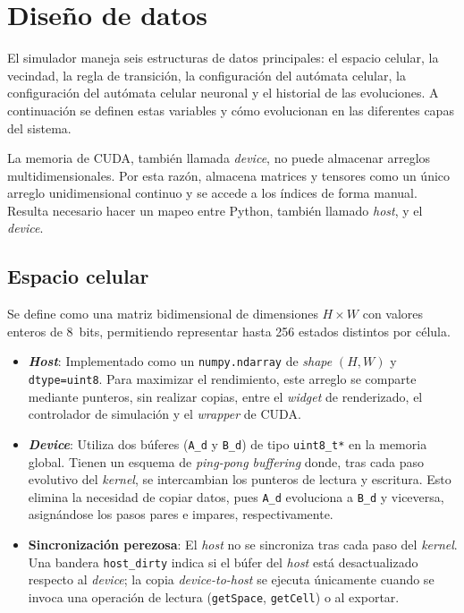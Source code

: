 \section{Diseño de datos}

El simulador maneja seis estructuras de datos principales: el espacio celular, la vecindad, la regla de transición, la configuración del autómata celular, la configuración del autómata celular neuronal y el historial de las evoluciones. A continuación se definen estas variables y cómo evolucionan en las diferentes capas del sistema.

La memoria de CUDA, también llamada \textit{device}, no puede almacenar arreglos multidimensionales. Por esta razón, almacena matrices y tensores como un único arreglo unidimensional continuo y se accede a los índices de forma manual. Resulta necesario hacer un mapeo entre Python, también llamado \textit{host}, y el \textit{device}.

\subsection{Espacio celular}

Se define como una matriz bidimensional de dimensiones $H \times W$ con valores enteros de 8~bits, permitiendo representar hasta 256 estados distintos por célula.

\begin{itemize}
	\item \textbf{\textit{Host}}: Implementado como un \texttt{numpy.ndarray} de \textit{shape} $(H, W)$ y \texttt{dtype=uint8}. Para maximizar el rendimiento, este arreglo se comparte mediante punteros, sin realizar copias, entre el \textit{widget} de renderizado, el controlador de simulación y el \textit{wrapper} de CUDA.
	
	\item \textbf{\textit{Device}}: Utiliza dos búferes (\texttt{A\_d} y \texttt{B\_d}) de tipo \texttt{uint8\_t*} en la memoria global. Tienen un esquema de \textit{ping-pong buffering} donde, tras cada paso evolutivo del \textit{kernel}, se intercambian los punteros de lectura y escritura. Esto elimina la necesidad de copiar datos, pues \texttt{A\_d} evoluciona a \texttt{B\_d} y viceversa, asignándose los pasos pares e impares, respectivamente.
	
	\item \textbf{Sincronización perezosa}: El \textit{host} no se sincroniza tras cada paso del \textit{kernel}. Una bandera \texttt{host\_dirty} indica si el búfer del \textit{host} está desactualizado respecto al \textit{device}; la copia \textit{device-to-host} se ejecuta únicamente cuando se invoca una operación de lectura (\texttt{getSpace}, \texttt{getCell}) o al exportar.
\end{itemize}

